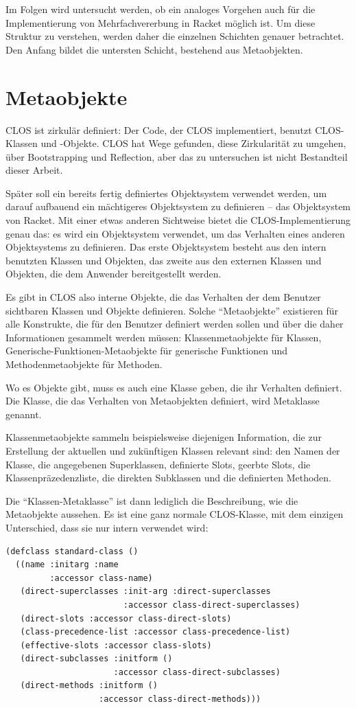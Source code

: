 Im Folgen wird untersucht werden, ob ein analoges Vorgehen auch für die Implementierung von Mehrfachvererbung in Racket möglich ist. Um diese Struktur zu verstehen, werden daher die einzelnen Schichten genauer betrachtet. Den Anfang bildet die untersten Schicht, bestehend aus Metaobjekten.

\section{Metaobjekte}
CLOS ist zirkulär definiert: Der Code, der CLOS implementiert, benutzt CLOS-Klassen und -Objekte. CLOS hat Wege gefunden, diese Zirkularität zu umgehen, über Bootstrapping und Reflection, aber das zu untersuchen ist nicht Bestandteil dieser Arbeit. 

Später soll ein bereits fertig definiertes Objektsystem verwendet werden, um darauf aufbauend ein mächtigeres Objektsystem zu definieren -- das Objektsystem von Racket. Mit einer etwas anderen Sichtweise bietet die CLOS-Implementierung genau das: es wird ein Objektsystem verwendet, um das Verhalten eines anderen Objektsystems zu definieren. Das erste Objektsystem besteht aus den intern benutzten Klassen und Objekten, das zweite aus den externen Klassen und Objekten, die dem Anwender bereitgestellt werden.

Es gibt in CLOS also interne Objekte, die das Verhalten der dem Benutzer sichtbaren Klassen und Objekte definieren. Solche ``Metaobjekte'' existieren für alle Konstrukte, die für den Benutzer definiert werden sollen und über die daher Informationen gesammelt werden müssen: Klassenmetaobjekte für Klassen, Generische-Funktionen-Metaobjekte für generische Funktionen und Methodenmetaobjekte für Methoden. 

Wo es Objekte gibt, muss es auch eine Klasse geben, die ihr Verhalten definiert. Die Klasse, die das Verhalten von Metaobjekten definiert, wird Metaklasse genannt. 

Klassenmetaobjekte sammeln beispielsweise diejenigen Information, die zur Erstellung der aktuellen und zukünftigen Klassen relevant sind: den Namen der Klasse, die angegebenen Superklassen, definierte Slots, geerbte Slots, die Klassenpräzedenzliste, die direkten Subklassen und die definierten Methoden. 

Die ``Klassen-Metaklasse'' ist dann lediglich die Beschreibung, wie die Metaobjekte aussehen. Es ist eine ganz normale CLOS-Klasse, mit dem einzigen Unterschied, dass sie nur intern verwendet wird:

\begin{lstlisting}
(defclass standard-class ()
  ((name :initarg :name
         :accessor class-name)
   (direct-superclasses :init-arg :direct-superclasses
                        :accessor class-direct-superclasses)
   (direct-slots :accessor class-direct-slots)
   (class-precedence-list :accessor class-precedence-list)
   (effective-slots :accessor class-slots)
   (direct-subclasses :initform ()
                      :accessor class-direct-subclasses)
   (direct-methods :initform ()
                   :accessor class-direct-methods)))
\end{lstlisting}

